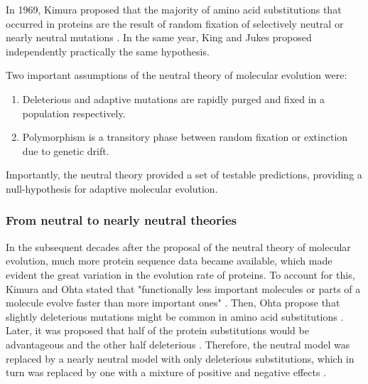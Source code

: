 In 1969, Kimura proposed that the majority of amino acid substitutions that occurred in proteins are the result of random fixation of selectively neutral or nearly neutral mutations  \citep{Kimura1969}. In the same year, King and Jukes \citep{King1969} proposed independently practically the same hypothesis.

Two important assumptions of the neutral theory of molecular evolution were:

\begin{enumerate}
\item Deleterious and adaptive mutations are rapidly purged and fixed in a population respectively.
\item Polymorphism is a transitory phase between random fixation or extinction due to genetic drift.
\end{enumerate}

Importantly, the neutral theory provided a set of testable predictions, providing a null-hypothesis for adaptive molecular evolution.

\subsubsection{From neutral to nearly neutral theories}

In the subsequent decades after the proposal of the neutral theory of molecular evolution, much more protein sequence data became available, which made evident the great variation in the evolution rate of proteins.
To account for this, Kimura and Ohta stated that "functionally less important molecules or parts of a molecule evolve faster than more important ones" \citep{Kimura1974}.
Then, Ohta propose that slightly deleterious mutations might be common in amino acid substitutions \citep{Ohta1973}. Later, it was proposed that half of the protein substitutions would be advantageous and the other half deleterious \citep{gillespie1994causes}.
Therefore, the neutral model was replaced by a nearly neutral model with only deleterious substitutions, which in turn was replaced by one with a mixture of positive and negative effects \citep{Ohta1996}.

